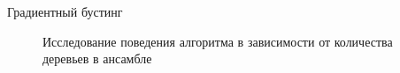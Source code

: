 \documentclass[12pt]{article}
\begin{document}
\begin{section}{Градиентный бустинг}
\begin{figure}[h!]
\begin{minipage}[h]{0.5\linewidth}
\end{minipage}
\hfill
\begin{minipage}[h]{0.5\linewidth}
\end{minipage}
\caption{Исследование поведения алгоритма в зависимости от количества деревьев в ансамбле}
\label{ris:image1}
\end{figure}


\end{section}
\end{document}
